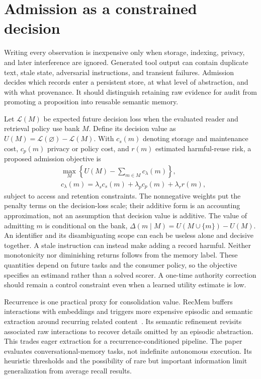 \section{Admission as a constrained decision}\label{sec:C14:admission}
Writing every observation is inexpensive only when storage, indexing, privacy, and later interference are ignored. Generated tool output can contain duplicate text, stale state, adversarial instructions, and transient failures. Admission decides which records enter a persistent store, at what level of abstraction, and with what provenance. It should distinguish retaining raw evidence for audit from promoting a proposition into reusable semantic memory.

Let $\mathcal L(M)$ be expected future decision loss when the evaluated reader and retrieval policy use bank $M$. Define its decision value as $U(M)=\mathcal L(\varnothing)-\mathcal L(M)$. With $c_s(m)$ denoting storage and maintenance cost, $c_p(m)$ privacy or policy cost, and $r(m)$ estimated harmful-reuse risk, a proposed admission objective is
\begin{align}
 &\max_M\left\{U(M)-\sum_{m\in M}c_\lambda(m)\right\},\\
 &c_\lambda(m)=\lambda_s c_s(m)+\lambda_p c_p(m)+\lambda_r r(m),
\end{align}
subject to access and retention constraints. The nonnegative weights put the penalty terms on the decision-loss scale; their additive form is an accounting approximation, not an assumption that decision value is additive. The value of admitting $m$ is conditional on the bank, $\Delta(m\mid M)=U(M\cup\{m\})-U(M)$. An identifier and its disambiguating scope can each be useless alone and decisive together. A stale instruction can instead make adding a record harmful. Neither monotonicity nor diminishing returns follows from the memory label. These quantities depend on future tasks and the consumer policy, so the objective specifies an estimand rather than a solved scorer. A one-time authority correction should remain a control constraint even when a learned utility estimate is low.

Recurrence is one practical proxy for consolidation value. RecMem buffers interactions with embeddings and triggers more expensive episodic and semantic extraction around recurring related content~\cite{dai2026recmem}. Its semantic refinement revisits associated raw interactions to recover details omitted by an episodic abstraction. This trades eager extraction for a recurrence-conditioned pipeline. The paper evaluates conversational-memory tasks, not indefinite autonomous execution. Its heuristic thresholds and the possibility of rare but important information limit generalization from average recall results.

